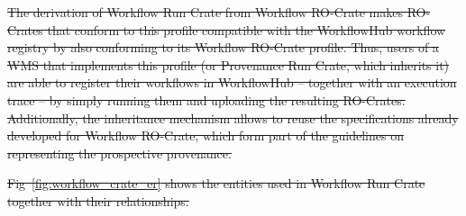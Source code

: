 \documentclass[10pt,letterpaper]{article}
\providecommand{\DIFdeltex}[1]{{\protect\color{red}\sout{#1}}}                      %
\providecommand{\DIFdelbegin}{} %
\providecommand{\DIFdelend}{} %
\providecommand{\DIFdel}[1]{\texorpdfstring{\DIFdeltex{#1}}{}} %
\newcommand{\DIFscaledelfig}{0.5}
\newlength{\DIFdelgraphicswidth} %
\newlength{\DIFdelgraphicsheight} %
\newcommand{\DIFdelincludegraphics}[2][]{%
\sbox{\DIFdelgraphicsbox}{\DIFOincludegraphics[#1]{#2}}%
\settoboxwidth{\DIFdelgraphicswidth}{\DIFdelgraphicsbox} %
\settoboxtotalheight{\DIFdelgraphicsheight}{\DIFdelgraphicsbox} %
\scalebox{\DIFscaledelfig}{%
\parbox[b]{\DIFdelgraphicswidth}{\usebox{\DIFdelgraphicsbox}\\[-\baselineskip] \rule{\DIFdelgraphicswidth}{0em}}\llap{\resizebox{\DIFdelgraphicswidth}{\DIFdelgraphicsheight}{%
\setlength{\unitlength}{\DIFdelgraphicswidth}%
\begin{picture}(1,1)%
\thicklines\linethickness{2pt} %
{\color[rgb]{1,0,0}\put(0,0){\framebox(1,1){}}}%
{\color[rgb]{1,0,0}\put(0,0){\line( 1,1){1}}}%
{\color[rgb]{1,0,0}\put(0,1){\line(1,-1){1}}}%
\end{picture}%
}\hspace*{3pt}}} %
} %
\DeclareRobustCommand{\DIFdelbegin}{\DIFOdelbegin \let\includegraphics\DIFdelincludegraphics} %
\DeclareRobustCommand{\DIFdelend}{\DIFOaddend \let\includegraphics\DIFOincludegraphics} %
\begin{document}
\DIFdelbegin \DIFdel{The derivation of Workflow Run Crate from Workflow RO-Crate makes RO-Crates that conform to this profile compatible with the WorkflowHub workflow registry by also conforming to its Workflow RO-Crate profile.
Thus, users of a WMS that implements this profile (or Provenance Run Crate, which inherits it) are able to register their workflows in WorkflowHub -- together with an execution trace -- by simply running them and uploading the resulting RO-Crates.
Additionally, the inheritance mechanism allows to reuse the specifications already developed for Workflow RO-Crate, which form part of the guidelines on representing the prospective provenance.
}\DIFdelend %

\DIFdelbegin \DIFdel{Fig~\ref{fig:workflow_crate_er} shows the entities used in Workflow Run Crate together with their relationships.
}%
\end{document}

